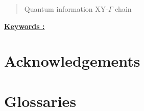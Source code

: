 \pagestyle{romanstyle}
\begin{abstract}
	\lipsum[1] %

    Quantum information XY-$\Gamma$ chain 

\end{abstract}

\underline{\textbf{Keywords :}}

\newpage
\section*{Acknowledgements}
\newpage



\newpage

		
\tableofcontents


\newpage

		\listoffigures

\newpage
		
		\listoftables

\newpage

\section*{Glossaries}

\newpage